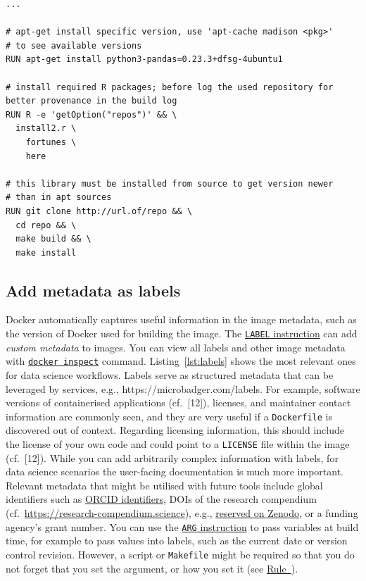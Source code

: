 \documentclass[10pt,letterpaper]{article}
\begin{document}
\begin{minipage}{\linewidth}

\begin{lstlisting}[language=docker,caption={Partial \texttt{Dockerfile} with examples for helpful comments.},breaklines=true,label={lst:comments}]
...

# apt-get install specific version, use 'apt-cache madison <pkg>' 
# to see available versions
RUN apt-get install python3-pandas=0.23.3+dfsg-4ubuntu1

# install required R packages; before log the used repository for better provenance in the build log
RUN R -e 'getOption("repos")' && \
  install2.r \
    fortunes \
    here

# this library must be installed from source to get version newer
# than in apt sources
RUN git clone http://url.of/repo && \
  cd repo && \
  make build && \
  make install
\end{lstlisting}

\end{minipage}

\normalsize

\hypertarget{add-metadata-as-labels}{%
\subsection{Add metadata as labels}\label{add-metadata-as-labels}}

Docker automatically captures useful information in the image metadata,
such as the version of Docker used for building the image. The
\href{https://docs.docker.com/engine/reference/builder/\#label}{\texttt{LABEL}
instruction} can add \emph{custom metadata} to images. You can view all
labels and other image metadata with
\href{https://docs.docker.com/engine/reference/commandline/inspect/}{\texttt{docker\ inspect}}
command. Listing~\ref{lst:labels} shows the most relevant ones for data
science workflows. Labels serve as structured metadata that can be
leveraged by services, e.g., https://microbadger.com/labels. For
example, software versions of containerised applications (cf.~{[}12{]}),
licenses, and maintainer contact information are commonly seen, and they
are very useful if a \texttt{Dockerfile} is discovered out of context.
Regarding licensing information, this should include the license of your
own code and could point to a \texttt{LICENSE} file within the image
(cf.~{[}12{]}). While you can add arbitrarily complex information with
labels, for data science scenarios the user-facing documentation is much
more important. Relevant metadata that might be utilised with future
tools include global identifiers such as \href{https://orcid.org/}{ORCID
identifiers}, DOIs of the research compendium
(cf.~\url{https://research-compendium.science}), e.g.,
\href{https://help.zenodo.org/}{reserved on Zenodo}, or a funding
agency's grant number. You can use the
\href{https://docs.docker.com/engine/reference/builder/\#arg}{\texttt{ARG}
instruction} to pass variables at build time, for example to pass values
into labels, such as the current date or version control revision.
However, a script or \texttt{Makefile} might be required so that you do
not forget that you set the argument, or how you set it (see
\hyperref[{rule:usage}]{Rule~}).
\end{document}
